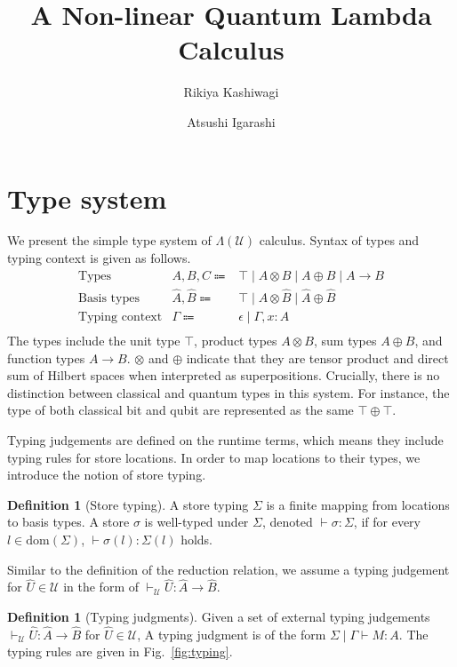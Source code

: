 \message{ !name(main.tex)}\documentclass[acmsmall, nonacm, review]{acmart}
\title{A Non-linear Quantum Lambda Calculus}
\author{Rikiya Kashiwagi}
\author{Atsushi Igarashi}
\affiliation{%
  \institution{Kyoto University}
  \department{Graduate School of Informatics}
  \city{Kyoto}
  \country{Japan}
}
\theoremstyle{plain}
\theoremstyle{definition}
\newtheorem{dfn}[thm]{Definition}
\theoremstyle{remark}
\begin{document}
\section{Type system} \label{sec:type-system}
We present the simple type system of $\Lambda(\mathcal{U})$ calculus.
Syntax of types and typing context is given as follows.
\begin{equation*}
  \begin{array}{lrl}
    \text{Types}          & A, B, C \Coloneqq          & \top\mid A\otimes B\mid A\oplus B\mid A\rightarrow B    \\
    \text{Basis types}    & \hat{A}, \hat{B} \Coloneqq & \top\mid\hat{A}\otimes \hat{B}\mid\hat{A}\oplus \hat{B} \\
    \text{Typing context} & \Gamma \Coloneqq           & \epsilon \mid \Gamma,x:A                                \\
  \end{array}
\end{equation*}
The types include the unit type $\top$, product types $A \otimes B$, sum types $A \oplus B$, and function types $A \rightarrow B$.
$\otimes$ and $\oplus$ indicate that they are tensor product and direct sum of Hilbert spaces when interpreted as superpositions.
Crucially, there is no distinction between classical and quantum types in this system.
For instance, the type of both classical bit and qubit are represented as the same $\top \oplus \top$.

Typing judgements are defined on the runtime terms, which means they include typing rules for store locations.
In order to map locations to their types, we introduce the notion of store typing.
\begin{dfn}[Store typing]
  A store typing $\Sigma$ is a finite mapping from locations to basis types.
  A store $\sigma$ is well-typed under $\Sigma$, denoted $\vdash \sigma : \Sigma$, if for every $l\in\text{dom}(\Sigma)$, $\vdash \sigma(l) : \Sigma(l)$ holds.
\end{dfn}

Similar to the definition of the reduction relation, we assume a typing judgement for $\hat{U}\in\mathcal{U}$ in the form of $\vdash_\mathcal{U} \hat{U} : \hat{A} \rightarrow \hat{B}$.
\begin{dfn}[Typing judgments]
  Given a set of external typing judgements $\vdash_\mathcal{U} \hat{U} : \hat{A} \rightarrow \hat{B}$ for $\hat{U}\in\mathcal{U}$,
  A typing judgment is of the form $\Sigma \mid \Gamma \vdash M : A$.
  The typing rules are given in Fig.~\ref{fig:typing}.
\end{dfn}
\end{document}
